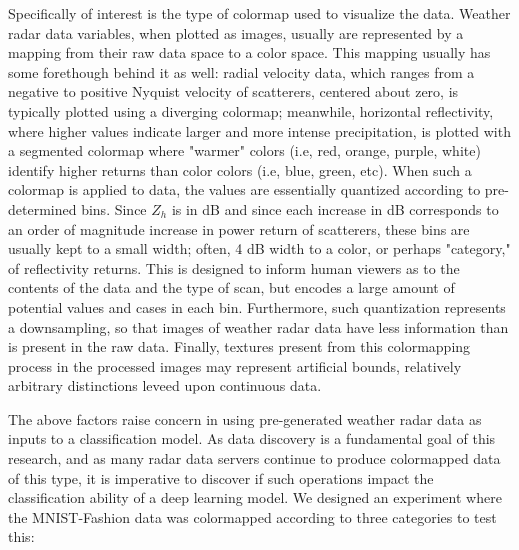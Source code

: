 Specifically of interest is the type of colormap used to visualize the data.
Weather radar data variables, when plotted as images, usually are represented by a mapping from their raw data space to a color space.
This mapping usually has some forethough behind it as well: radial velocity data, which ranges from a negative to positive Nyquist velocity of scatterers, centered about zero, is typically plotted using a diverging colormap; meanwhile, horizontal reflectivity, where higher values indicate larger and more intense precipitation, is plotted with a segmented colormap where "warmer" colors (i.e, red, orange, purple, white) identify higher returns than color colors (i.e, blue, green, etc).
When such a colormap is applied to data, the values are essentially quantized according to pre-determined bins.
Since $Z_h$ is in dB and since each increase in dB corresponds to an order of magnitude increase in power return of scatterers, these bins are usually kept to a small width; often, 4 dB width to a color, or perhaps "category," of reflectivity returns.
This is designed to inform human viewers as to the contents of the data and the type of scan, but encodes a large amount of potential values and cases in each bin.
Furthermore, such quantization represents a downsampling, so that images of weather radar data have less information than is present in the raw data.
Finally, textures present from this colormapping process in the processed images may represent artificial bounds, relatively arbitrary distinctions leveed upon continuous data.

The above factors raise concern in using pre-generated weather radar data as inputs to a classification model.
As data discovery is a fundamental goal of this research, and as many radar data servers continue to produce colormapped data of this type, it is imperative to discover if such operations impact the classification ability of a deep learning model.
We designed an experiment where the MNIST-Fashion data was colormapped according to three categories to test this:

